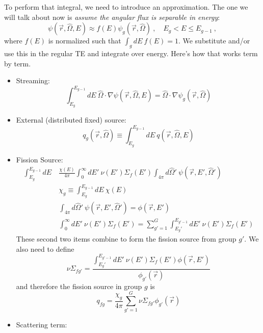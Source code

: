 \documentclass[12pt]{article}
\newcommand{\vOmega}{\ensuremath{\hat{\Omega}}}
\begin{document}
To perform that integral, we need to introduce an approximation. The one we will talk about now is \textit{assume the angular flux is separable in energy}:
\[
\psi(\vec{r}, \vOmega, E) \approx f(E)\psi_g(\vec{r}, \vOmega)\:, \quad E_g < E \leq E_{g-1}\:,
\]
where $f(E)$ is normalized such that $\int_g dE\: f(E) = 1$. We substitute and/or use this in the regular TE and integrate over energy. Here's how that works term by term.
%
\begin{itemize}
\item Streaming:
\[
\int_{E_g}^{E_{g-1}} dE\: \vOmega \cdot \nabla \psi(\vec{r}, \vOmega, E) = \vOmega \cdot \nabla \psi_g(\vec{r}, \vOmega)
\]

\item External (distributed fixed) source:
\[q_{g}(\vec{r}, \vOmega) \equiv \int_{E_g}^{E_{g-1}} dE\: q(\vec{r}, \vOmega, E)\]

\item Fission Source:
\begin{align*}
\int_{E_g}^{E_{g-1}} dE\: &\frac{\chi(E)}{4 \pi}\int_0^{\infty} dE' \: \nu(E') \Sigma_f(E') \int_{4 \pi} d\vOmega' \:\psi(\vec{r}, E', \vOmega') \\
&\chi_g \equiv \int_{E_g}^{E_{g-1}} dE\: \chi(E) \\
& \int_{4 \pi} d\vOmega' \:\psi(\vec{r}, E', \vOmega') = \phi(\vec{r}, E')\\
& \int_0^{\infty} dE' \: \nu(E') \Sigma_f(E') = \sum_{g'=1}^G \int_{E_g'}^{E_{g'-1}} dE'\: \nu(E') \Sigma_f(E')
\end{align*}
These second two items combine to form the fission source from group $g'$. We also need to define
\[
\nu\Sigma_{fg'} = \dfrac{\int_{E_g'}^{E_{g'-1}} dE'\: \nu(E') \Sigma_f(E')\phi(\vec{r}, E')}{\phi_{g'}(\vec{r})}
\]
and therefore the fission source in group $g$ is
\[
q_{fg} = \frac{\chi_g}{4 \pi}\sum_{g'=1}^G \nu\Sigma_{fg'} \phi_{g'}(\vec{r})
\]

\item Scattering term:
\end{itemize}
\end{document}
